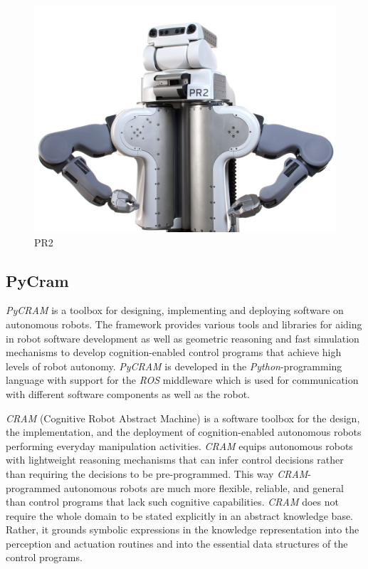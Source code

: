 \begin{figure}[H]
	\centering
	\includegraphics[scale=0.1]{Graphics/pr2.jpg}
	\caption{PR2 \cite{pr2}}
\end{figure}

\subsection{PyCram}
\label{sec:pycram}
\textit{PyCRAM} \cite{pycram} is a toolbox for designing, implementing and deploying software on autonomous robots. The framework provides various tools and libraries for aiding in robot software development as well as geometric reasoning and fast simulation mechanisms to develop cognition-enabled control programs that achieve high levels of robot autonomy.
\textit{PyCRAM} \cite{pycram} is developed in the \textit{Python}-programming language with support for the \textit{ROS} \cite{ros} middleware which is used for communication with different software components as well as the robot.

\textit{CRAM} \cite{beetz10cram} (Cognitive Robot Abstract Machine) is a software toolbox for the design, the implementation, and the deployment of cognition-enabled autonomous robots performing everyday manipulation activities.
\textit{CRAM} \cite{beetz10cram} equips autonomous robots with lightweight reasoning mechanisms that can infer control decisions rather than requiring the decisions to be pre-programmed. 
This way \textit{CRAM}-programmed autonomous robots are much more flexible, reliable, and general than control programs that lack such cognitive capabilities. 
\textit{CRAM} \cite{beetz10cram} does not require the whole domain to be stated explicitly in an abstract knowledge base. Rather, it grounds symbolic expressions in the knowledge representation into the perception and actuation routines and into the essential data structures of the control programs. 

